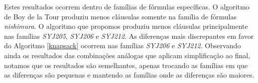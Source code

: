 Estes resultados ocorrem dentro de famílias de fórmulas específicas. O algoritmo de Boy de la Tour produziu menos cláusulas somente na família de fórmulas \emph{nishimura}. O algoritmo que propomos produziu menos cláusulas principalmente nas famílias \emph{SYJ205}, \emph{SYJ206} e \emph{SYJ212}. As diferenças mais discrepantes em favor do Algoritmo \ref{knapsack} ocorrem nas famílias \emph{SYJ206} e \emph{SYJ212}. Observando ainda os resultados das combinações análogas que aplicam simplificação ao final, notamos que os resultados são semelhantes, apenas trocando as famílias em que as diferenças são pequenas e mantendo as famílias onde as diferenças são maiores.







